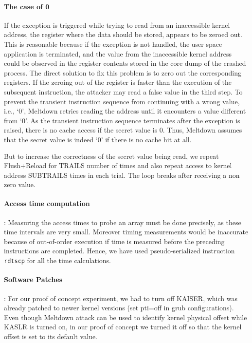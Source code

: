 \documentclass[runningheads]{llncs}
\begin{document}
\paragraph{The case of 0} If the exception is triggered while trying to read from an inaccessible kernel address, the register where the data should be stored, appears to be zeroed out. This is reasonable because if the exception is not handled, the user space application is terminated, and the value from the inaccessible kernel address could be observed in the register contents stored in the core dump of the crashed process. The direct solution to fix this problem is to zero out the corresponding registers. If the zeroing out of the register is faster than the execution of the subsequent instruction, the attacker may read a false value in the third step. To prevent the transient instruction sequence from continuing with a wrong value, i.e., ‘0’, Meltdown retries reading the address until it encounters a value different from ‘0’. As the transient instruction sequence terminates after the exception is raised, there is no cache access if the secret value is 0. Thus, Meltdown assumes that the secret value is indeed ‘0’ if there is no cache hit at all. 

But to increase the correctness of the secret value being read, we repeat Flush+Reload for TRAILS number of times and also repeat access to kernel address SUBTRAILS times in each trial. The loop breaks after receiving a non zero value. 

\paragraph{Access time computation}: Measuring the access times to probe an array must be done precisely, as these time intervals are very small. Moreover timing measurements would be inaccurate because of out-of-order execution if time is measured before the preceding instructions are completed. Hence, we have used pseudo-serialized instruction \texttt{rdtscp} for all the time calculations. 

\paragraph{Software Patches}: For our proof of concept experiment, we had to turn off KAISER, which was already patched to newer kernel versions (set pti=off in grub configurations). Even though Meltdown attack can be used to identify kernel physical offset while KASLR is turned on, in our proof of concept we turned it off so that the kernel offset is set to its default value.
\end{document}
